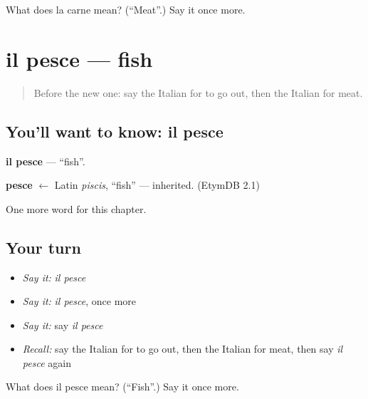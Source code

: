 \begin{tcolorbox}[breakable,colback=teal!4,colframe=teal!35!black,title={Before you move on}]
What does la carne mean? (\textquotedblleft{}Meat\textquotedblright{}.) Say it once more.
\end{tcolorbox}
\section[il pesce]{il pesce — fish}

\label{lesson:IT-C51-pesce}



\begin{quote}
Before the new one: say the Italian for to go out, then the Italian for meat.
\end{quote}

\subsection*{You'll want to know: il pesce}
\textbf{il pesce} — \textquotedblleft{}fish\textquotedblright{}.

\begin{cousinweb}
\textbf{pesce} $\leftarrow$ Latin \emph{piscis}, \textquotedblleft{}fish\textquotedblright{} — inherited. (EtymDB 2.1)
\end{cousinweb}

\begin{grammarlens}[title={What you've built}]
One more word for this chapter.
\end{grammarlens}

\subsection*{Your turn}
\begin{itemize}
\raggedright
  \item \emph{Say it:} \emph{il pesce}
  \item \emph{Say it:} \emph{il pesce}, once more
  \item \emph{Say it:} say \emph{il pesce}
  \item \emph{Recall:} say the Italian for to go out, then the Italian for meat, then say \emph{il pesce} again
\end{itemize}

\begin{tcolorbox}[breakable,colback=teal!4,colframe=teal!35!black,title={Before you move on}]
What does il pesce mean? (\textquotedblleft{}Fish\textquotedblright{}.) Say it once more.
\end{tcolorbox}
